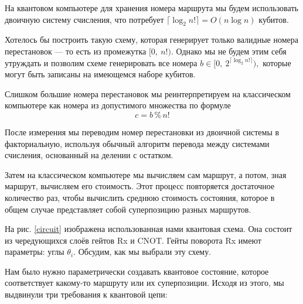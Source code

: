 На квантовом компьютере для хранения номера маршрута мы будем использовать двоичную систему счисления, что потребует $\lceil \log_2 n! \rceil = O(n \log n)$ кубитов. 

Хотелось бы построить такую схему, которая генерирует только валидные номера перестановок --- то есть из промежутка $[0,\: n!)$. Однако мы не будем этим себя утруждать и позволим схеме генерировать все номера $b \in [0,\: 2^{\lceil \log_2 n! \rceil}),$ которые могут быть записаны на имеющемся наборе кубитов.

Слишком большие номера перестановок мы реинтерпретируем на классическом компьютере как номера из допустимого множества по формуле
$$c = b \mathbin{\%} n!$$

После измерения мы переводим номер перестановки из двоичной системы в факториальную, используя обычный алгоритм перевода между системами счисления, основанный на делении с остатком.

Затем на классическом компьютере мы вычисляем сам маршрут, а потом, зная маршрут, вычисляем его стоимость. Этот процесс повторяется достаточное количество раз, чтобы вычислить среднюю стоимость состояния, которое в общем случае представляет собой суперпозицию разных маршрутов.





На рис. \ref{circuit} изображена использованная нами квантовая схема. Она состоит из чередующихся слоёв гейтов Rx и CNOT. Гейты поворота Rx имеют параметры: углы $\theta_i$. Обсудим, как мы выбрали эту схему.


Нам было нужно параметрически создавать квантовое состояние, которое соответствует какому-то маршруту или их суперпозиции. Исходя из этого, мы выдвинули три требования к квантовой цепи:

